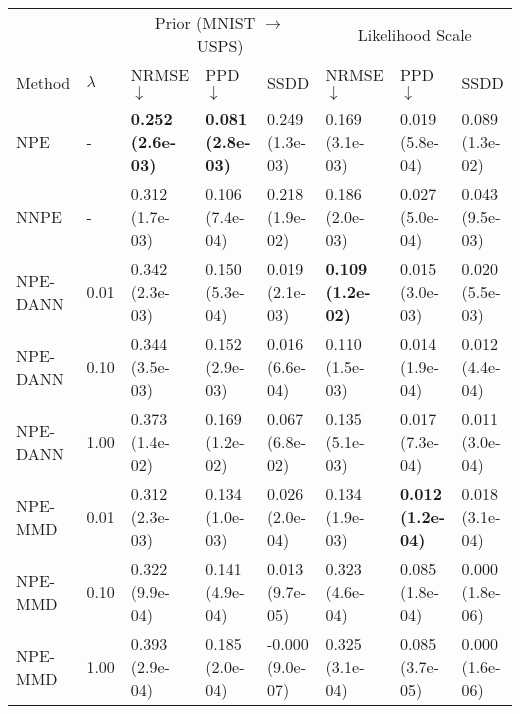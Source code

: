 \begin{tabular}{ ll |lll|lll}
     \toprule
            &           & \multicolumn{3}{c}{Prior (MNIST $\rightarrow$ USPS)} & \multicolumn{3}{c}{Likelihood Scale} \\
     Method & $\lambda$ & NRMSE $\downarrow$ & PPD $\downarrow$ & SSDD& NRMSE $\downarrow$ & PPD $\downarrow$ & SSDD \\
     \midrule
NPE & - & \cellcolor{lime!100} \textbf{0.252 (2.6e-03)} & \cellcolor{lime!100} \textbf{0.081 (2.8e-03)} & \cellcolor{LightSkyBlue1!0} 0.249 (1.3e-03) & \cellcolor{lime!72} 0.169 (3.1e-03) & \cellcolor{lime!91} 0.019 (5.8e-04) & \cellcolor{LightSkyBlue1!0} 0.089 (1.3e-02) \vspace{0.1cm}\\
NNPE & - & \cellcolor{lime!57} 0.312 (1.7e-03) & \cellcolor{lime!75} 0.106 (7.4e-04) & \cellcolor{LightSkyBlue1!12} 0.218 (1.9e-02) & \cellcolor{lime!64} 0.186 (2.0e-03) & \cellcolor{lime!79} 0.027 (5.0e-04) & \cellcolor{LightSkyBlue1!51} 0.043 (9.5e-03) \vspace{0.1cm}\\
NPE-DANN & 0.01 & \cellcolor{lime!36} 0.342 (2.3e-03) & \cellcolor{lime!33} 0.150 (5.3e-04) & \cellcolor{LightSkyBlue1!92} 0.019 (2.1e-03) & \cellcolor{lime!100} \textbf{0.109 (1.2e-02)} & \cellcolor{lime!95} 0.015 (3.0e-03) & \cellcolor{LightSkyBlue1!77} 0.020 (5.5e-03) \\
NPE-DANN & 0.10 & \cellcolor{lime!34} 0.344 (3.5e-03) & \cellcolor{lime!31} 0.152 (2.9e-03) & \cellcolor{LightSkyBlue1!93} 0.016 (6.6e-04) & \cellcolor{lime!99} 0.110 (1.5e-03) & \cellcolor{lime!97} 0.014 (1.9e-04) & \cellcolor{LightSkyBlue1!86} 0.012 (4.4e-04) \\
NPE-DANN & 1.00 & \cellcolor{lime!13} 0.373 (1.4e-02) & \cellcolor{lime!15} 0.169 (1.2e-02) & \cellcolor{LightSkyBlue1!73} 0.067 (6.8e-02) & \cellcolor{lime!88} 0.135 (5.1e-03) & \cellcolor{lime!93} 0.017 (7.3e-04) & \cellcolor{LightSkyBlue1!87} 0.011 (3.0e-04) \vspace{0.1cm}\\
NPE-MMD & 0.01 & \cellcolor{lime!57} 0.312 (2.3e-03) & \cellcolor{lime!48} 0.134 (1.0e-03) & \cellcolor{LightSkyBlue1!89} 0.026 (2.0e-04) & \cellcolor{lime!88} 0.134 (1.9e-03) & \cellcolor{lime!100} \textbf{0.012 (1.2e-04)} & \cellcolor{LightSkyBlue1!80} 0.018 (3.1e-04) \\
NPE-MMD & 0.10 & \cellcolor{lime!50} 0.322 (9.9e-04) & \cellcolor{lime!42} 0.141 (4.9e-04) & \cellcolor{LightSkyBlue1!94} 0.013 (9.7e-05) & \cellcolor{lime!0} 0.323 (4.6e-04) & \cellcolor{lime!0} 0.085 (1.8e-04) & \cellcolor{LightSkyBlue1!99} 0.000 (1.8e-06) \\
NPE-MMD & 1.00 & \cellcolor{lime!0} 0.393 (2.9e-04) & \cellcolor{lime!0} 0.185 (2.0e-04) & \cellcolor{LightSkyBlue1!100} -0.000 (9.0e-07) & \cellcolor{lime!0} 0.325 (3.1e-04) & \cellcolor{lime!0} 0.085 (3.7e-05) & \cellcolor{LightSkyBlue1!100} 0.000 (1.6e-06) \vspace{0.1cm}\\

     \hline
    \end{tabular}